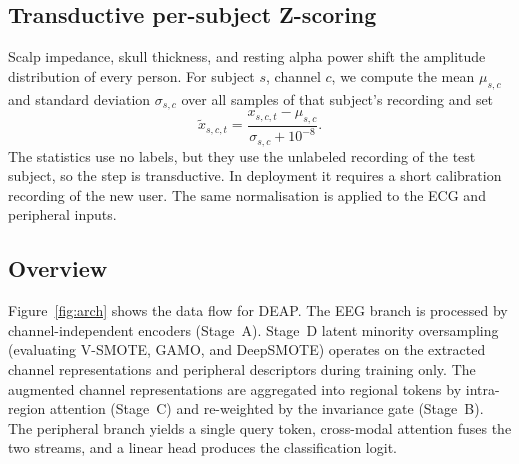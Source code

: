 \documentclass[a4paper,fleqn]{cas-sc}
\begin{document}
\subsection{Transductive per-subject Z-scoring}
Scalp impedance, skull thickness, and resting alpha power shift the amplitude distribution of every person. For subject $s$, channel $c$, we compute the mean $\mu_{s,c}$ and standard deviation $\sigma_{s,c}$ over all samples of that subject's recording and set
\begin{equation}
\tilde{x}_{s,c,t}=\frac{x_{s,c,t}-\mu_{s,c}}{\sigma_{s,c}+10^{-8}}.\label{eq:z}
\end{equation}
The statistics use no labels, but they use the unlabeled recording of the test subject, so the step is transductive. In deployment it requires a short calibration recording of the new user. The same normalisation is applied to the ECG and peripheral inputs.

\subsection{Overview}
Figure~\ref{fig:arch} shows the data flow for DEAP. The EEG branch is processed by channel-independent encoders (Stage~A). Stage~D latent minority oversampling (evaluating V-SMOTE, GAMO, and DeepSMOTE) operates on the extracted channel representations and peripheral descriptors during training only. The augmented channel representations are aggregated into regional tokens by intra-region attention (Stage~C) and re-weighted by the invariance gate (Stage~B). The peripheral branch yields a single query token, cross-modal attention fuses the two streams, and a linear head produces the classification logit.
\end{document}
